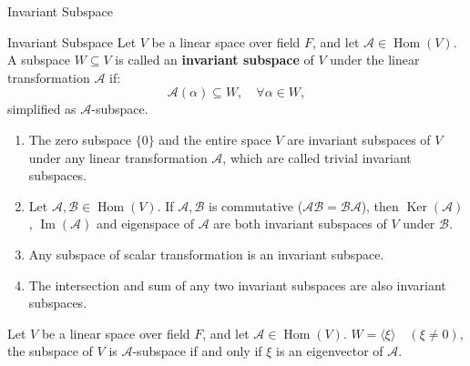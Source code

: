 \documentclass[11pt]{../../TexTemplate/elegantbook} %
\begin{document}
\begin{leftbarTitle}{Invariant Subspace}\end{leftbarTitle}
\begin{definition}{Invariant Subspace}
    Let \( V \) be a linear space over field \( F \), 
    and let \( \mathcal{A}\in \operatorname{Hom}(V) \).
    A subspace \( W \subseteq V \) is called an \textbf{invariant subspace} of \( V \)
    under the linear transformation \( \mathcal{A} \) if:
    \[
    \mathcal{A}(\alpha) \subseteq W, \quad \forall \alpha \in W,
    \]
    simplified as \( \mathcal{A} \)-subspace.
\end{definition}

\begin{property}
    \begin{enumerate}
        \item The zero subspace \( \{0\} \) and the entire space \( V \) are invariant subspaces of \( V \) 
            under any linear transformation \( \mathcal{A} \), which are called trivial invariant subspaces. 
        \item Let \( \mathcal{A}, \mathcal{B} \in \operatorname{Hom}(V) \). 
            If \( \mathcal{A}, \mathcal{B} \) is commutative (\( \mathcal{AB} = \mathcal{BA} \)), 
            then \( \operatorname{Ker}(\mathcal{A}) \), \( \operatorname{Im}(\mathcal{A}) \) and 
            eigenspace of \( \mathcal{A} \) are both invariant subspaces of \( V \) under \( \mathcal{B} \).
        \item Any subspace of scalar transformation is an invariant subspace.
        \item The intersection and sum of any two invariant subspaces are also invariant subspaces.
    \end{enumerate}
\end{property}

\begin{proposition}
    Let \( V \) be a linear space over field \( F \), and let \( \mathcal{A}\in \operatorname{Hom}(V) \).
    \( W = \langle \xi \rangle \quad (\xi\neq 0)\), the subspace of \( V \) is \( \mathcal{A} \)-subspace if and only if 
    \( \xi \) is an eigenvector of \( \mathcal{A} \).
\end{proposition}
\end{document}
